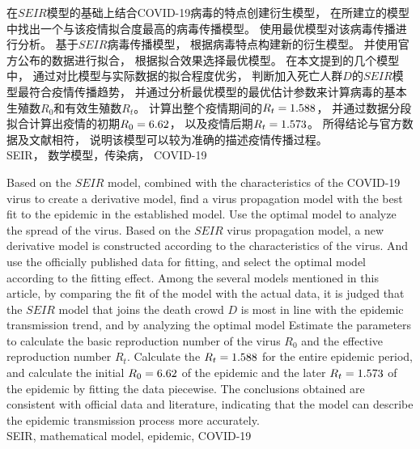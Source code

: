 \begin{cnabstract}
    \songti {}
    在$SEIR$模型的基础上结合COVID-19病毒的特点创建衍生模型，
    在所建立的模型中找出一个与该疫情拟合度最高的病毒传播模型。
    使用最优模型对该病毒传播进行分析。
    基于$SEIR$病毒传播模型，
    根据病毒特点构建新的衍生模型。
    并使用官方公布的数据进行拟合，
    根据拟合效果选择最优模型。
    在本文提到的几个模型中，
    通过对比模型与实际数据的拟合程度优劣，
    判断加入死亡人群$D$的$SEIR$模型最符合疫情传播趋势，
    并通过分析最优模型的最优估计参数来计算病毒的基本生殖数$R_0$和有效生殖数$R_t$。
    计算出整个疫情期间的$R_t=1.588$，
    并通过数据分段拟合计算出疫情的初期$R_0=6.62$，
    以及疫情后期$R_t=1.573$。
    所得结论与官方数据及文献相符，
    说明该模型可以较为准确的描述疫情传播过程。
    \\
     SEIR， 数学模型，传染病， COVID-19
\end{cnabstract}
\begin{enabstract}
    Based on the $ SEIR $ model,
    combined with the characteristics of the COVID-19 virus to create a derivative model,
    find a virus propagation model with the best fit to the epidemic in the established model.
    Use the optimal model to analyze the spread of the virus.
    Based on the $ SEIR $ virus propagation model,
    a new derivative model is constructed according to the characteristics of the virus.
    And use the officially published data for fitting,
    and select the optimal model according to the fitting effect.
    Among the several models mentioned in this article,
    by comparing the fit of the model with the actual data,
    it is judged that the $ SEIR $ model that joins the death crowd $ D $ is most in line with the epidemic transmission trend,
    and by analyzing the optimal model Estimate the parameters to calculate the basic reproduction number of the virus $ R_0 $ and the effective reproduction number $ R_t $.
    Calculate the $ R_t = 1.588 $ for the entire epidemic period,
    and calculate the initial $ R_0 = 6.62 $ of the epidemic and the later $ R_t = 1.573 $ of the epidemic by fitting the data piecewise.
    The conclusions obtained are consistent with official data and literature,
    indicating that the model can describe the epidemic transmission process more accurately.
    \\
     SEIR, mathematical model, epidemic, COVID-19
\end{enabstract}